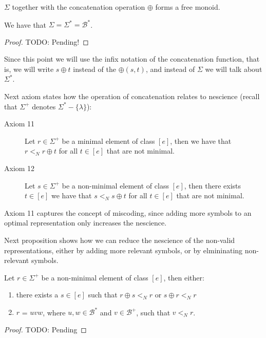 \vskip 0.25cm

$\Sigma$ together with the concatenation operation $\oplus$ forms a free monoid.

\begin{proposition}
We have that $\Sigma = \Sigma^\ast = \mathcal{B}^\ast$. 
\end{proposition}
\begin{proof}
{\color{red} TODO: Pending!}
\end{proof}

Since this point we will use the infix notation of the concatenation function, that is, we will write $s \oplus t$ instead of the $\oplus(s, t)$, and instead of $\Sigma$ we will talk about $\Sigma^\ast$.

Next axiom states how the operation of concatenation relates to nescience (recall that $\Sigma^{+}$ denotes $\Sigma^\ast-\{\lambda\}$):

\vskip 0.25cm

\begin{description}
\item[Axiom 11] Let $r \in \Sigma^{+}$ be a minimal element of class $[e]$, then we have that $r <_N r \oplus t$ for all $t \in [e]$ that are not minimal.
\item[Axiom 12] Let $s \in \Sigma^{+}$ be a non-minimal element of class $[e]$, then there exists $t \in [e]$ we have that $s <_N s \oplus t$ for all $t \in [e]$ that are not minimal.
\end{description}

\vskip 0.25cm

Axiom 11 captures the concept of miscoding, since adding more symbols to an optimal representation only increases the nescience.

Next proposition shows how we can reduce the nescience of the non-valid representations, either by adding more relevant symbols, or by elmininating non-relevant symbols.

\begin{proposition}
Let $r \in \Sigma^{+}$ be a non-minimal element of class $[e]$, then either:
\begin{enumerate}[label=(\roman*)]
\item there exists a $s \in [e]$ such that $r \oplus s <_N r$ or $s \oplus r <_N r$
\item $r$ = $uvw$, where $u, w \in \mathcal{B}^\ast$ and $v \in \mathcal{B}^{+}$, such that $v <_N r$.
\end{enumerate}
\end{proposition}
\begin{proof}
{\color{red} TODO: Pending}
\end{proof}

